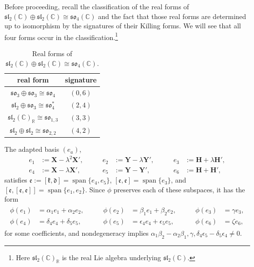 \documentclass[10pt,a4paper]{amsart}
\DeclareMathOperator{\spanOperator}{span}
\newcommand{\Span}[1]{\spanOperator\{{#1}\}}
\newcommand{\bbC}{\mathbb{C}}
\newcommand{\bbR}{\mathbb{R}}
\newcommand{\mbH}{\mathbf{H}}
\newcommand{\mbX}{\mathbf{X}}
\newcommand{\mbY}{\mathbf{Y}}
\newcommand{\mfd} {\mathfrak{d}}
\newcommand{\mfe} {\mathfrak{e}}
\newcommand{\mfk} {\mathfrak{k}}
\newcommand{\mfsl} {\mathfrak{sl}}
\newcommand{\mfso} {\mathfrak{so}}
\numberwithin{equation}{section}
\begin{document}
Before proceeding, recall the classification of the real forms of $\mfsl_2(\bbC) \oplus \mfsl_2(\bbC) \cong \mfso_4(\bbC)$ and the fact that those real forms are determined up to isomorphism by the signatures of their Killing forms. We will see that all four forms occur in the classification.\footnote{Here $\mfsl_2(\bbC)_{\bbR}$ is the real Lie algebra underlying $\mfsl_2(\bbC)$.}

\begin{table}[htb]\small\centering
\caption{Real forms of $\mfsl_2(\bbC) \oplus \mfsl_2(\bbC) \cong \mfso_4(\bbC)$.}\label{table:real-forms-sl2C-sl2C}

\vspace{1mm}

\begin{tabular}{cc}
\toprule
 real form
 & signature \\
\midrule
	 $\mfso_3 \oplus \mfso_3 \cong \mfso_4$
 & $(0, 6)$ \\
	 $\mfsl_2 \oplus \mfso_3 \cong \mfso_4^*$
 & $(2, 4)$ \\
	 $\mfsl_2(\bbC)_{\bbR} \cong \mfso_{1, 3}$
 & $(3, 3)$ \\
	 $\mfsl_2 \oplus \mfsl_2 \cong \mfso_{2, 2}$
 & $(4, 2)$ \\
\bottomrule
\end{tabular}
\end{table}

The adapted basis $(e_a)$,
\begin{equation*}
\begin{alignedat}{3}
	 e_1 &:= \mbX - \lambda^2 \mbX' , \qquad
	&e_2 &:= \mbY - \lambda \mbY' , \qquad
	&e_3 &:= \mbH + \lambda \mbH' , \\
	 e_4 &:= \mbX - \lambda \mbX' , \qquad
	&e_5 &:= \mbY - \mbY' , \qquad
	&e_6 &:= \mbH + \mbH' ,
\end{alignedat}
\end{equation*}
satisfies $\mfe := [\mfk, \mfd] = \Span{e_4, e_5}$, $[\mfe, \mfe] = \Span{e_3}$, and $[\mfe, [\mfe, \mfe]] = \Span{e_1, e_2}$. Since $\phi$ preserves each of these subspaces, it has the form
\begin{gather}\label{equation:phi-D.6-lambda}
\begin{alignedat}{3}
	 \phi(e_1) &= \alpha_1 e_1 + \alpha_2 e_2, \qquad
	&\phi(e_2) &= \beta_1 e_1 + \beta_2 e_2, \qquad
	&\phi(e_3) &= \gamma e_3 , \\
	 \phi(e_4) &= \delta_4 e_4 + \delta_5 e_5, \qquad
	&\phi(e_5) &= \epsilon_4 e_4 + \epsilon_5 e_5, \qquad
	&\phi(e_6) &= \zeta e_6 ,
\end{alignedat}
\end{gather}
for some coefficients, and nondegeneracy implies $\alpha_1 \beta_2 - \alpha_2 \beta_1, \gamma, \delta_4 \epsilon_5 - \delta_5 \epsilon_4 \neq 0$.
\end{document}
